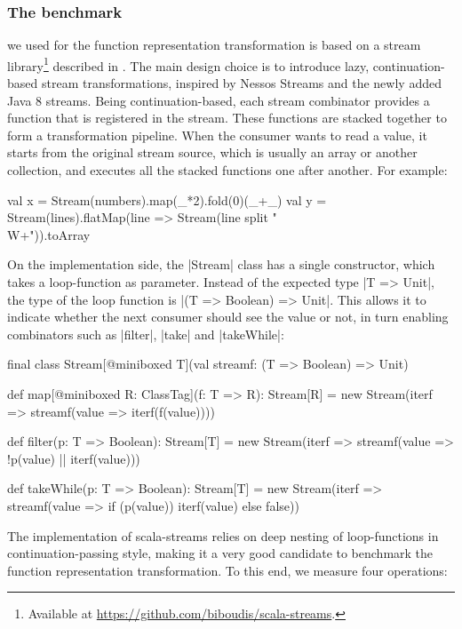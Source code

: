 \subsubsection{The benchmark} we used for the function representation transformation is based on a stream library\footnote{Available at \url{https://github.com/biboudis/scala-streams}.} described in \cite{biboudis_clash_2014}. The main design choice is to introduce lazy, continuation-based stream transformations, inspired by Nessos Streams \cite{nessos_streams} and the newly added Java 8 streams. Being continuation-based, each stream combinator provides a function that is registered in the stream. These functions are stacked together to form a transformation pipeline. When the consumer wants to read a value, it starts from the original stream source, which is usually an array or another collection, and executes all the stacked functions one after another. For example:

\begin{lstlisting-nobreak}
val x = Stream(numbers).map(_*2).fold(0)(_+_)
val y = Stream(lines).flatMap(line => Stream(line split "\\W+")).toArray
\end{lstlisting-nobreak}

On the implementation side, the |Stream| class has a single constructor, which takes a loop-function as parameter. Instead of the expected type |T => Unit|, the type of the loop function is |(T => Boolean) => Unit|. This allows it to indicate whether the next consumer should see the value or not, in turn enabling combinators such as |filter|, |take| and |takeWhile|:

\begin{lstlisting-nobreak}
final class Stream[@miniboxed T](val streamf: (T => Boolean) => Unit) {

  def map[@miniboxed R: ClassTag](f: T => R): Stream[R] =
    new Stream(iterf => streamf(value => iterf(f(value))))

  def filter(p: T => Boolean): Stream[T] =
    new Stream(iterf => streamf(value => !p(value) || iterf(value)))

  def takeWhile(p: T => Boolean): Stream[T] =
    new Stream(iterf => streamf(value => if (p(value)) iterf(value) else false))
}
\end{lstlisting-nobreak}

The implementation of scala-streams relies on deep nesting of loop-functions in continuation-passing style, making it a very good candidate to benchmark the function representation transformation. To this end, we measure four operations:

